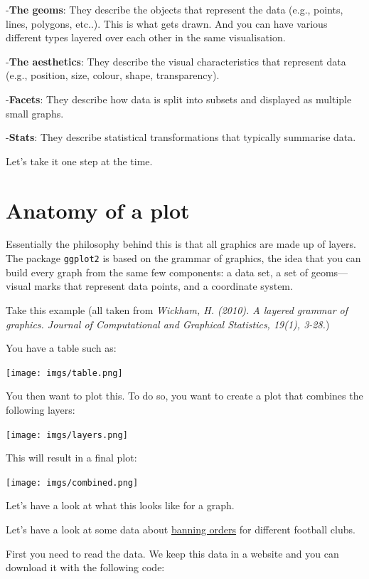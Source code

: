 \documentclass[
]{book}
\begin{document}
-\textbf{The geoms}: They describe the objects that represent the data (e.g., points, lines, polygons, etc..). This is what gets drawn. And you can have various different types layered over each other in the same visualisation.

-\textbf{The aesthetics}: They describe the visual characteristics that represent data (e.g., position, size, colour, shape, transparency).

-\textbf{Facets}: They describe how data is split into subsets and displayed as multiple small graphs.

-\textbf{Stats}: They describe statistical transformations that typically summarise data.

Let's take it one step at the time.

\hypertarget{anatomy-of-a-plot}{%
\section{Anatomy of a plot}\label{anatomy-of-a-plot}}

Essentially the philosophy behind this is that all graphics are made up of layers. The package \texttt{ggplot2} is based on the grammar of graphics, the idea that you can build every graph from the same few components: a data set, a set of geoms---visual marks that represent data points, and a coordinate system.

Take this example (all taken from \emph{Wickham, H. (2010). A layered grammar of graphics. Journal of Computational and Graphical Statistics, 19(1), 3-28.})

You have a table such as:

\texttt{[image: imgs/table.png]}

You then want to plot this. To do so, you want to create a plot that combines the following layers:

\texttt{[image: imgs/layers.png]}

This will result in a final plot:

\texttt{[image: imgs/combined.png]}

Let's have a look at what this looks like for a graph.

Let's have a look at some data about \href{https://www.gov.uk/government/publications/football-related-arrests-and-banning-orders-england-and-wales-season-2016-to-2017/football-related-arrests-and-banning-order-statistics-england-and-wales-2016-to-2017-season}{banning orders} for different football clubs.

First you need to read the data. We keep this data in a website and you can download it with the following code:
\end{document}
